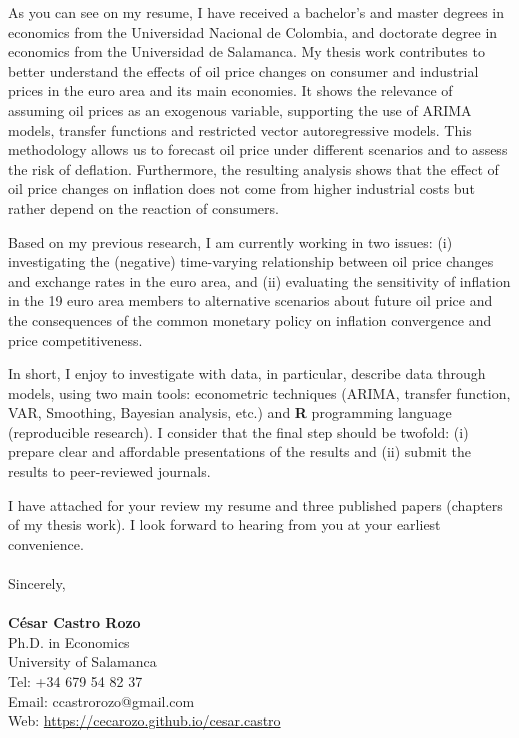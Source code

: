 \documentclass{letter}\usepackage[]{graphicx}\usepackage[]{color}
\begin{document}
{As you can see on my resume, I have received a bachelor's and master degrees in economics from the Universidad Nacional de Colombia, and doctorate degree in economics from the Universidad de Salamanca. My thesis work contributes to better understand the effects of oil price changes on consumer and industrial prices in the euro area and its main economies. It shows the relevance of assuming oil prices as an exogenous variable, supporting the use of ARIMA models, transfer functions and restricted vector autoregressive models. This methodology allows us to forecast oil price under different scenarios and to assess the risk of deflation. Furthermore, the resulting analysis shows that the effect of oil price changes on inflation does not come from higher industrial costs but rather depend on the reaction of consumers.

Based on my previous research, I am currently working in two issues: (i) investigating the (negative) time-varying relationship between oil price changes and exchange rates in the euro area, and (ii) evaluating the sensitivity of inflation in the 19 euro area members to alternative scenarios about future oil price and the consequences of the common monetary policy on inflation convergence and price competitiveness.

In short, I enjoy to investigate with data, in particular, describe data through models, using two main tools: econometric techniques (ARIMA, transfer function, VAR, Smoothing, Bayesian analysis, etc.) and \textbf{\textsf{R}} programming language (reproducible research). I consider that the final step should be twofold: (i) prepare clear and affordable presentations of the results and (ii) submit the results to peer-reviewed journals.

I have attached for your review my resume and three published papers (chapters of my thesis work). I look forward to hearing from you at your earliest convenience.\\
\\
Sincerely,\\
\\
\textbf{César Castro Rozo}\\
Ph.D. in Economics\\
University of Salamanca\\
Tel: +34 679 54 82 37\\
Email: ccastrorozo@gmail.com\\
Web: \href{https://cecarozo.github.io/cesar.castro}{https://cecarozo.github.io/cesar.castro}



}
\end{document}

